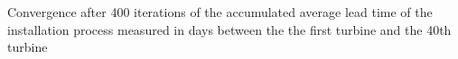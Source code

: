 \label{fig:convergence}
Convergence after 400 iterations of the accumulated average lead time of the installation process measured in days between the the first turbine and the 40th turbine 